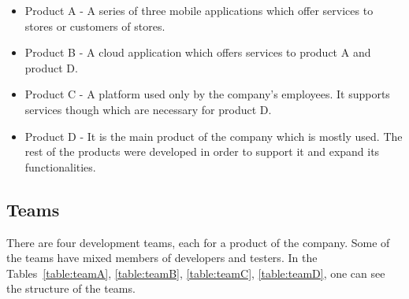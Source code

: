 \begin{itemize}
\item Product A - A series of three mobile applications which offer services to stores or customers of stores.
\item Product B - A cloud application which offers services to product A and product D.
\item Product C - A platform used only by the company's employees. It supports services though which are necessary for product D.
\item Product D - It is the main product of the company which is mostly used. The rest of the products were developed in order to support it and expand its functionalities.

\end{itemize}

\subsection{Teams}
There are four development teams, each for a product of the company. Some of the teams have mixed members of developers and testers. In the Tables~\ref{table:teamA}, \ref{table:teamB}, \ref{table:teamC}, \ref{table:teamD}, one can see the structure of the teams. \\

